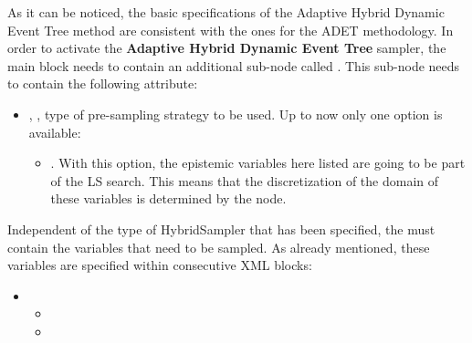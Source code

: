 As it can be noticed, the basic specifications of the Adaptive Hybrid Dynamic Event Tree
method are consistent with the ones for the ADET methodology.
In order to activate the \textbf{Adaptive Hybrid Dynamic Event Tree}  sampler, the main
 block needs to contain an additional
sub-node called .
This sub-node needs to contain the following attribute:
\begin{itemize}
  \item {}, , type of
    pre-sampling strategy to be used.
    Up to now only one option is available:
    \begin{itemize}
      \item {}. With this option, the epistemic variables here listed are going to be part of the LS search.
                                                        This means that the discretization of the domain of these variables is determined by the
                                                         node.
    \end{itemize}
 \end{itemize}
Independent of the type of HybridSampler that has been specified, the
 must contain the variables that need to be sampled.
%
As already mentioned, these variables are specified within consecutive
 XML blocks:
\begin{itemize}
  \item \variableDescription
    \variableChildrenIntro
    \begin{itemize}
      \item \distributionDescription
      \item \functionDescription
    \end{itemize}
 \end{itemize}


